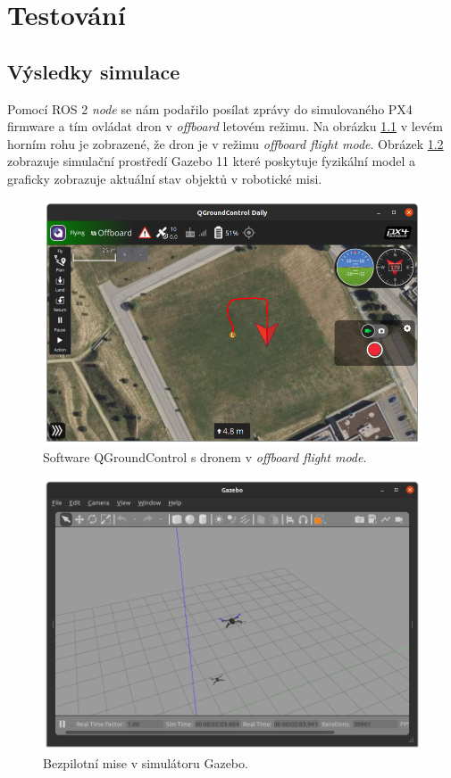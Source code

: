 \chapter{Testování}



\section{Výsledky simulace}

Pomocí ROS 2 \textit{node} se nám podařilo posílat zprávy do simulovaného PX4 firmware a tím ovládat dron v \textit{offboard} letovém režimu. Na obrázku \ref{fig:SIM3} v levém horním rohu je zobrazené, že dron je v režimu \textit{offboard flight mode}. Obrázek \ref{fig:SIM4} zobrazuje simulační prostředí Gazebo 11 které poskytuje fyzikální model  a graficky zobrazuje aktuální stav objektů v robotické misi.

\begin{figure}[!ht]
  \begin{center}
    \includegraphics[scale=0.43]{obrazky/SIM3}
  \end{center}
  \caption[Software QGroundControl s dronem v \textit{offboard flight mode}]{Software QGroundControl s dronem v \textit{offboard flight mode}.}
  \label{fig:SIM3}
\end{figure}

\begin{figure}[!ht]
  \begin{center}
    \includegraphics[scale=0.4]{obrazky/SIM4}
  \end{center}
  \caption[Bezpilotní mise v simulátoru Gazebo]{Bezpilotní mise v simulátoru Gazebo.}
  \label{fig:SIM4}
\end{figure}